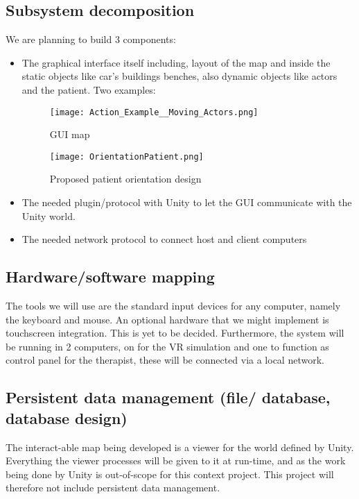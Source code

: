 \documentclass[11pt]{article}
\begin{document}
    \subsection{Subsystem decomposition}
    We are planning to build 3 components:
	\begin{itemize}
  		\item The graphical interface itself including, layout of the map and inside the static objects like car's buildings benches, also dynamic objects like actors and the patient. Two examples:
        \begin{figure}[H]
              \caption{GUI map}
              \texttt{[image: Action\_Example\_\_Moving\_Actors.png]}             
          \end{figure}
          
          \begin{figure}[H]
              \caption{Proposed patient orientation design}
              \texttt{[image: OrientationPatient.png]}             
          \end{figure}
  		\item The needed plugin/protocol with Unity to let the GUI communicate with the Unity world.
        \item The needed network protocol to connect host and client computers
	\end{itemize}   
    
    \subsection{Hardware/software mapping }
    The tools we will use are the standard input devices for any computer, namely the keyboard and mouse. An optional hardware that we might implement is touchscreen integration. This is yet to be decided.
    Furthermore, the system will be running in 2 computers, on for the VR simulation and one to function as control panel for the therapist, these will be connected via a local network.
    
    \subsection{Persistent data management (file/ database, database design)}
    The interact-able map being developed is a viewer for the world defined by Unity. Everything the viewer processes will be given to it at run-time, and as the work being done by Unity is out-of-scope for this context project. This project will therefore not include persistent data management.
    
\end{document}
